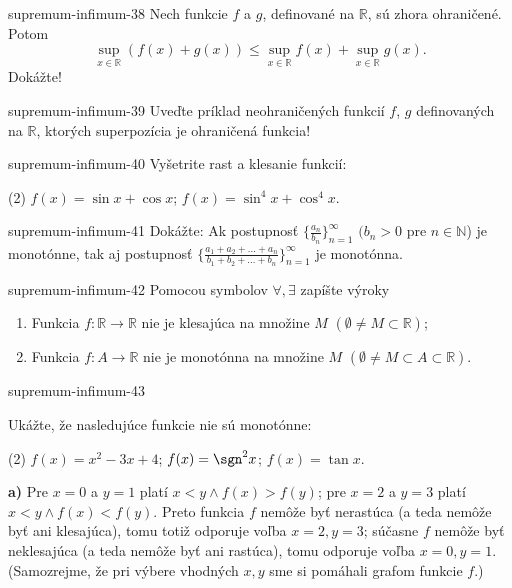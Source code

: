 \begin{defproblem}{supremum-infimum-38}
Nech funkcie $f$ a $g$, definované na $\mathbb{R}$, sú zhora ohraničené. Potom
$$\sup_{x\in\mathbb{R}}(f(x)+g(x))\leq\sup_{x\in\mathbb{R}}f(x)+\sup_{x\in\mathbb{R}}g(x).$$
Dokážte!
\end{defproblem}

\begin{defproblem}{supremum-infimum-39}
Uveďte príklad neohraničených funkcií $f$, $g$ definovaných na $\mathbb{R}$,
ktorých superpozícia je ohraničená funkcia!
\end{defproblem}

\begin{defproblem}{supremum-infimum-40}
Vyšetrite rast a klesanie funkcií:
\begin{tasks}(2)
  \task $f(x)=\sin x +\cos x$;
  \task $f(x)=\sin^4 x +\cos^4 x$.
\end{tasks}
\end{defproblem}

\begin{defproblem}{supremum-infimum-41}
Dokážte: Ak postupnosť $\{\frac{a_n}{b_n}\}_{n=1}^\infty$ $(b_n>0$ pre $n\in\mathbb{N}$) je monotónne, tak aj postupnosť $\{\frac{a_1+a_2+...+a_n}{b_1+b_2+...+b_n}\}_{n=1}^\infty$ je monotónna.
\end{defproblem}

\begin{defproblem}{supremum-infimum-42}
Pomocou symbolov $\forall,\exists$ zapíšte výroky
\begin{enumerate}
\item Funkcia $f:\mathbb{R}\rightarrow\mathbb{R}$ nie je klesajúca na množine $M$ $(\emptyset \neq M\subset\mathbb{R})$;
\item Funkcia $f:A \rightarrow\mathbb{R}$ nie je monotónna na množine $M$ $(\emptyset \neq M\subset A \subset\mathbb{R})$.
\end{enumerate}
\end{defproblem}

\begin{defproblem}{supremum-infimum-43}
\begin{samepage}
Ukážte, že nasledujúce funkcie nie sú monotónne:
\begin{tasks}(2)
  \task $f(x) = x^2 - 3x + 4$;
  \task $f(x) = \sgn^2 x$;
  \task $f(x) = \tan x$.
\end{tasks}
\end{samepage}
\begin{solution}
  \textbf{a)}
  Pre $x=0$ a $y=1$ platí $x<y\wedge f(x)>f(y)$; pre $x=2$ a $y=3$ platí
  $x<y\wedge f(x)<f(y)$. Preto funkcia $f$ nemôže byť nerastúca (a teda nemôže
  byť ani klesajúca), tomu totiž odporuje voľba $x=2,y=3$; súčasne $f$ nemôže byť
  neklesajúca (a teda nemôže byť ani rastúca), tomu odporuje voľba $x=0,y=1$.
  (Samozrejme, že pri výbere vhodných $x,y$ sme si pomáhali grafom funkcie $f$.)
  \end{solution}
\end{defproblem}

